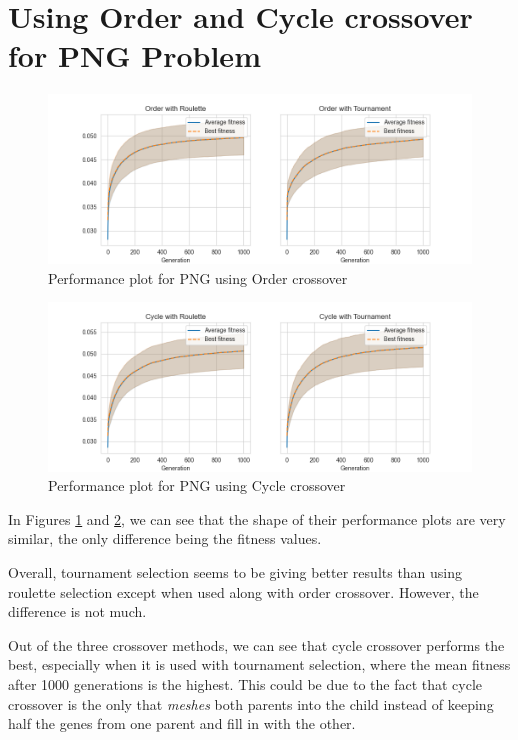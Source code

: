 \section{Using Order and Cycle crossover for PNG Problem}

\begin{figure}[ht]
    \centering
    \includegraphics[width=\textwidth]{../images/p56/p56order.png}
    \caption{Performance plot for PNG using Order crossover}
    \label{fig:p5b}
\end{figure}

\begin{figure}[ht]
    \centering
    \includegraphics[width=\textwidth]{../images/p56/p56cycle.png}
    \caption{Performance plot for PNG using Cycle crossover}
    \label{fig:p5c}
\end{figure}

In Figures \ref{fig:p5b} and \ref{fig:p5c}, we can see that the shape of their performance plots are very similar, the only difference being the fitness values.

Overall, tournament selection seems to be giving better results than using roulette selection except when used along with order crossover. However, the difference is not much. 

Out of the three crossover methods, we can see that cycle crossover performs the best, especially when it is used with tournament selection, where the mean fitness after 1000 generations is the highest. This could be due to the fact that cycle crossover is the only that \textit{meshes} both parents into the child instead of keeping half the genes from one parent and fill in with the other.
